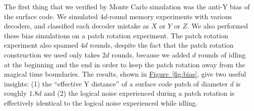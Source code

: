 \documentclass[onecolumn,unpublished,a4paper]{quantumarticle}
\theoremstyle{definition}
\theoremstyle{definition}
\theoremstyle{definition}
\newcommand{\fig}[1]{\hyperref[fig:#1]{Figure~\ref*{fig:#1}}}
\begin{document}
The first thing that we verified by Monte Carlo simulation was the anti-Y bias of the surface code.
We simulated $4d$-round memory experiments with various decoders, and classified each decoder mistake as $X$ or $Y$ or $Z$.
We also performed these bias simulations on a patch rotation experiment.
The patch rotation experiment also spanned $4d$ rounds, despite the fact that the patch rotation construction we used only takes $2d$ rounds, because we added $d$ rounds of idling at the beginning and the end in order to keep the patch rotation away from the magical time boundaries.
The results, shown in \fig{bias}, give two useful insights: (1) the ``effective Y distance'' of a surface code patch of diameter $d$ is roughly $1.8d$ and (2) the logical noise experienced during a patch rotation is effectively identical to the logical noise experienced while idling.
\end{document}
